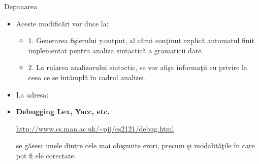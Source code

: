 \documentclass[pdf]{beamer}
\begin{document}
\begin{frame}{Depanarea}
\begin{itemize}
	\item
	Aceste modificări vor duce la:

	\begin{itemize}
		\item<cir@1->
		1. Generarea fişierului {\color{red}y.output}, al cărui conţinut explică automatul finit implementat pentru analiza sintactică a gramaticii date.

		\item<cir@1->
		2. La rularea analizorului sintactic, se vor afişa informaţii cu privire la ceea ce se întâmplă în cadrul analizei.

	\end{itemize}

	\item
	La adresa:
	\newline

	\item[]
	\textbf{Debugging Lex, Yacc, etc.}
	
	\url{http://www.cs.man.ac.uk/~pjj/cs2121/debug.html}
	\newline
	
	se găsesc unele dintre cele mai obişnuite erori, precum şi modalităţile în care pot fi ele corectate.

\end{itemize}
\end{frame}
\end{document}
